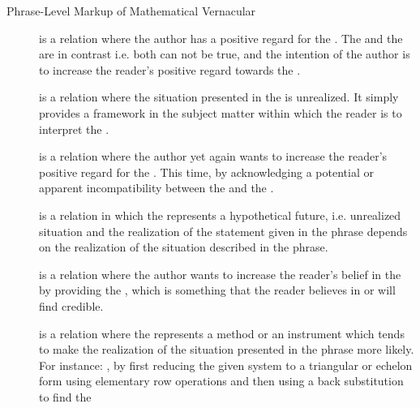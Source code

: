 \begin{module}[id=mtext]
\begin{omgroup}[id=mtext,short=Mathematical Text]
\begin{omgroup}[id=phrases]{Phrase-Level Markup of Mathematical Vernacular}
\begin{description}
\item[{}] is a relation where the author has a
  positive regard for the {}. The
  {} and the {} are in
  contrast i.e. both can not be true, and the intention of the author is to increase the
  reader's positive regard towards the {}.
\item[{}] is a relation where the situation
  presented in the {} is unrealized. It simply provides a
  framework in the subject matter within which the reader is to interpret the
  {}.
\item[{}] is a relation where the author yet again
  wants to increase the reader's positive regard for the
  {}. This time, by acknowledging a potential or apparent
  incompatibility between the {} and the
  {}.
\item[{}] is a relation in which the
  {} represents a hypothetical future, i.e. unrealized
  situation and the realization of the statement given in the
  {} phrase depends on the realization of the situation
  described in the {} phrase.
\item[{}] is a relation where the author wants to
  increase the reader's belief in the {} by providing the
  {}, which is something that the reader believes in or
  will find credible.
\item[{}] is a relation where the
  {} represents a method or an instrument which tends to
  make the realization of the situation presented in the {}
  phrase more likely.  For instance: {}, by first reducing the given system to a triangular or echelon
  form using elementary row operations and then using a back substitution to find the

\end{description}
\end{omgroup}
\end{omgroup}
\end{module}
